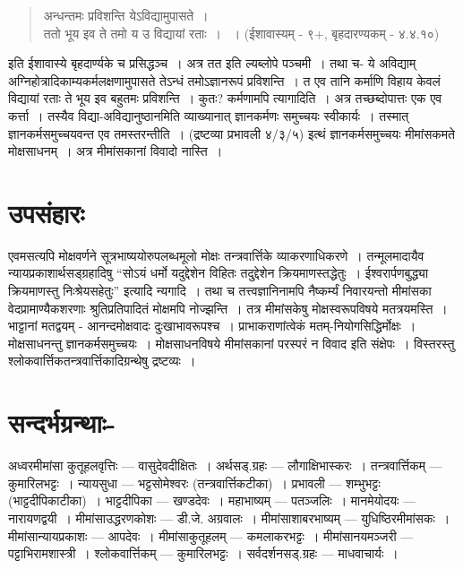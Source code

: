 {\begin{verse}
अन्धन्तमः प्रविशन्ति येऽविद्यामुपासते~। \\
ततो भूय इव ते तमो य उ विद्यायां रताः~। ~। (ईशावास्यम् - ९+, बृहदारण्यकम् - ४.४.१०)
\end{verse}
इति ईशावास्ये बृहदार्ण्यके च प्रसिद्धञ्च~। अत्र तत इति ल्यब्लोपे पञ्चमी~। तथा च- ये अविद्याम् अग्निहोत्रादिकाम्यकर्मलक्षणामुपासते तेऽन्धं तमोऽज्ञानरूपं प्रविशन्ति~। त एव तानि कर्माणि विहाय केवलं विद्यायां रताः ते भूय इव बहुतमः प्रविशन्ति~। कुतः? कर्मणामपि त्यागादिति~। अत्र तच्छब्दोपात्तः एक एव कर्त्ता~। तस्यैव विद्या-अविद्यानुष्ठानमिति व्याख्यानात् ज्ञानकर्मणः समुच्चयः स्वीकार्यः~। तस्मात् ज्ञानकर्मसमुच्चयवन्त एव तमस्तरन्तीति~। (द्रष्टव्या प्रभावली ४/३/५) इत्थं ज्ञानकर्मसमुच्चयः मीमांसकमते मोक्षसाधनम्~। अत्र मीमांसकानां विवादो नास्ति~। 

\section*{उपसंहारः}

एवमसत्यपि मोक्षवर्णने सूत्रभाष्ययोरुपलब्धमूलो मोक्षः तन्त्रवार्त्तिके व्याकरणाधिकरणे~। तन्मूलमादायैव न्यायप्रकाशार्थसड्ग्रहादिषु “सोऽयं धर्मो यदुद्देशेन विहितः तदु्द्देशेन क्रियमाणस्तद्धेतुः~। ईश्वरार्पणबुद्ध्या क्रियमाणस्तु निःश्रेयसहेतुः” इत्यादि न्यगादि~। तथा च तत्त्वज्ञानिनामपि नैष्कर्म्यं निवारयन्तो मीमांसका वेदप्रामाण्यैकशरणाः श्रुतिप्रतिपादितं मोक्षमपि नोज्झन्ति~। तत्र मीमांसकेषु मोक्षस्वरूपविषये मतत्रयमस्ति~। भाट्टानां मतद्वयम् - आनन्दमोक्षवादः दुःखाभावरूपश्च~। प्राभाकराणांत्वेकं मतम्-नियोगसिद्धिर्मोक्षः~। मोक्षसाधनन्तु ज्ञानकर्मसमुच्चयः~। मोक्षसाधनविषये मीमांसकानां परस्परं न विवाद इति संक्षेपः~। विस्तरस्तु श्लोकवार्त्तिकतन्त्रवार्त्तिकादिग्रन्थेषु द्रष्टव्यः~। 
 
\section*{सन्दर्भग्रन्थाः-} 
 
\begin{thebibliography}{99}
 अध्वरमीमांसा कुतूहलवृत्तिः --- वासुदेवदीक्षितः~। 
 अर्थसड्.ग्रहः --- लौगाक्षिभास्करः~। 
 तन्त्रवार्त्तिकम् --- कुमारिलभट्टः~। 
 न्यायसुधा --- भट्टसोमेश्वरः (तन्त्रवार्त्तिकटीका)~। 
 प्रभावली --- शम्भुभट्टः (भाट्टदीपिकाटीका)~। 
 भाट्टदीपिका --- खण्डदेवः~। 
 महाभाष्यम् --- पतञ्जलिः~। 
 मानमेयोदयः --- नारायणद्वयी~। 
 मीमांसाउद्धरणकोशः --- डी.जे. अग्रवालः~। 
 मीमांसाशाबरभाष्यम् --- युधिष्ठिरमीमांसकः~। 
 मीमांसान्यायप्रकाशः --- आपदेवः~। 
 मीमांसाकुतूहलम् --- कमलाकरभट्टः~। 
 मीमांसानयमञ्जरी --- पट्टाभिरामशास्त्री~। 
 श्लोकवार्त्तिकम् --- कुमारिलभट्टः~। 
 सर्वदर्शनसड्.ग्रहः --- माधवाचार्यः~। 
\end{thebibliography}

\articleend
}
